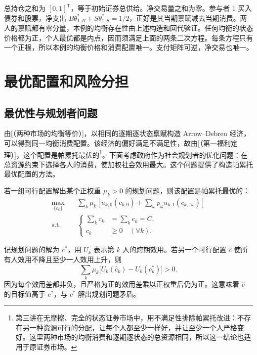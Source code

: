 \begin{tcolorbox}[example]
\begin{solution}[blank-type=manual,blank-vsep=7\baselineskip]
总持仓之和为 $[0,1]^{\mathsf T}$，等于初始证券总供给。净交易量之和为零。参与者 1 买入债券和股票，净支出 $B\theta_{1,B}^*+S\theta_{1,S}^*=1/2$，正好是其当期禀赋减去当期消费。两人的禀赋都有零分量，本例的均衡存在性由上述构造和回代验证。任何均衡的状态价格都为正，个人最优都是内点，因而须满足上面的两条二次方程。每条方程只有一个正根，所以本例的均衡价格和消费配置唯一。支付矩阵可逆，净交易也唯一。
\end{solution}
\end{tcolorbox}

\section{最优配置和风险分担}\label{sec:wj-ten-2}
\subsection{最优性与规划者问题}
由[（两种市场的均衡等价）]，以相同的逐期逐状态禀赋构造 Arrow--Debreu 经济，可以得到同一均衡消费配置。该经济的偏好满足不满足性，故由[（第一福利定理）]，这个配置是帕累托最优的\footnote{第三讲在无摩擦、完全的状态证券市场中，用不满足性排除帕累托改进：不存在另一种资源可行的分配，让每个人都至少一样好，并让至少一个人严格变好。这里两种市场的均衡消费和逐期逐状态的总资源相同，所以这一结论也适用于原证券市场。}。下面考虑政府作为社会规划者的优化问题：在总资源约束下选择各人的消费，使加权社会效用最大。这个问题提供了构造帕累托最优配置的方法。
\begin{tcolorbox}[knowledge]
 若一组可行配置解出某个正权重 $\mu_k>0$ 的规划问题，则该配置是帕累托最优的：
\begin{equation}
 \begin{aligned}
 \max_{\{c_k\}}\quad &\sum_k\mu_k\left[u_{k,0}(c_{k,0})+
 \sum_\omega p_\omega u_{k,1}(c_{k,1\omega})\right]\\
 \text{s.t.}\quad &
 \left\{\begin{aligned}
 \sum_k c_k&=\sum_k e_k=C,\\
 c_k&\ge0\quad(\forall k).
 \end{aligned}\right.
 \end{aligned}
 \label{eq:wj-10-7}
\end{equation}
\end{tcolorbox}

\begin{solution}[label-content={证明},blank-type=none]
记规划问题的解为 $c^*$，用 $U_k$ 表示第 $k$ 人的跨期效用。若另一个可行配置 $\widehat c$ 使所有人效用不降且至少一人效用上升，则
\[
 \sum_k\mu_k\bigl[U_k(\widehat c_k)-U_k(c_k^*)\bigr]>0.
\]
因为每个效用差都非负，且严格为正的效用差乘以正权重后仍为正。这意味着 $\widehat c$ 的目标值高于 $c^*$，与 $c^*$ 解出规划问题矛盾。
\end{solution}

